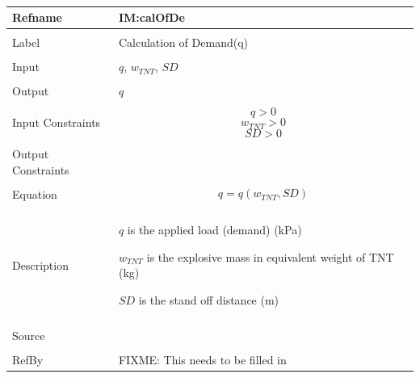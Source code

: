 \documentclass[12pt]{article}
\begin{document}
~\newline
\noindent \begin{minipage}{\textwidth}
\begin{tabular}{p{} p{}}
\toprule \textbf{Refname} & \textbf{IM:calOfDe}
\label{IM:calOfDe}
\\ \midrule \\
Label & Calculation of Demand(q)
\\ \midrule \\
Input & $q$, ${w_{TNT}}$, $SD$
\\ \midrule \\
Output & $q$
\\ \midrule \\
Input Constraints & \begin{dmath}
                    q>0
                    \end{dmath}
                    \begin{dmath}
                    {w_{TNT}}>0
                    \end{dmath}
                    \begin{dmath}
                    SD>0
                    \end{dmath}
\\ \midrule \\
Output Constraints & 
\\ \midrule \\
Equation & \begin{dmath}
           q=q\left({w_{TNT}},SD\right)
           \end{dmath}
\\ \midrule \\
Description & \begin{description}
              \item{$q$ is the applied load (demand) (kPa)}
              \item{${w_{TNT}}$ is the explosive mass in equivalent weight of TNT (kg)}
              \item{$SD$ is the stand off distance (m)}
              \end{description}
\\ \midrule \\
Source & 
\\ \midrule \\
RefBy & FIXME: This needs to be filled in
\\ \bottomrule \end{tabular}
\end{minipage}\\
\end{document}
